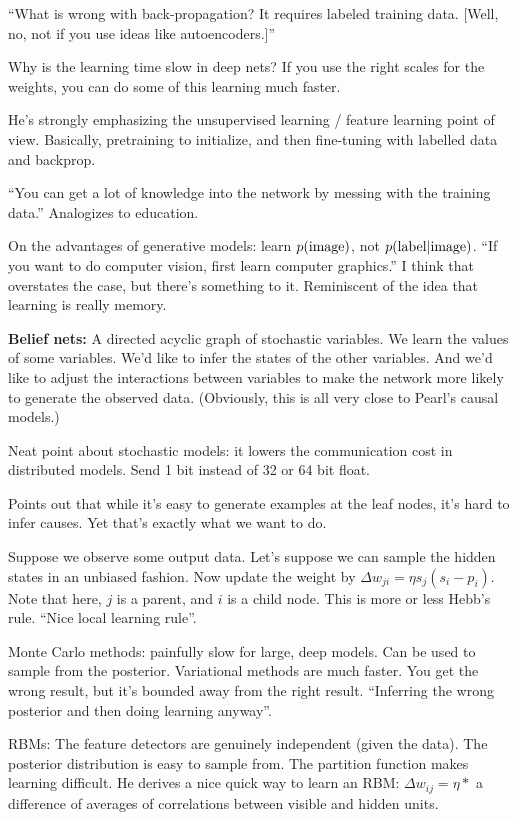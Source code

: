 \documentclass[12pt]{report}
\begin{document}
``What is wrong with back-propagation?  It requires labeled training
data. [Well, no, not if you use ideas like autoencoders.]''

Why is the learning time slow in deep nets?  If you use the right
scales for the weights, you can do some of this learning much faster.

He's strongly emphasizing the unsupervised learning / feature learning
point of view.  Basically, pretraining to initialize, and then
fine-tuning with labelled data and backprop.

``You can get a lot of knowledge into the network by messing with the
training data.''  Analogizes to education.  

On the advantages of generative models: learn $p({\rm image})$, not
$p({\rm label | image})$.  ``If you want to do computer vision, first
learn computer graphics.''  I think that overstates the case, but
there's something to it.  Reminiscent of the idea that learning is
really memory.

\textbf{Belief nets:} A directed acyclic graph of stochastic
variables.  We learn the values of some variables.  We'd like to infer
the states of the other variables.  And we'd like to adjust the
interactions between variables to make the network more likely to
generate the observed data.  (Obviously, this is all very close to
Pearl's causal models.)

Neat point about stochastic models: it lowers the communication cost
in distributed models.  Send 1 bit instead of 32 or 64 bit float.

Points out that while it's easy to generate examples at the leaf
nodes, it's hard to infer causes.  Yet that's exactly what we want to
do.

Suppose we observe some output data.  Let's suppose we can sample the
hidden states in an unbiased fashion.  Now update the weight by
$\Delta w_{ji} = \eta s_j (s_i-p_i)$.  Note that here, $j$ is a
parent, and $i$ is a child node.  This is more or less Hebb's rule.
``Nice local learning rule''.

Monte Carlo methods: painfully slow for large, deep models.  Can be
used to sample from the posterior.  Variational methods are much
faster.  You get the wrong result, but it's bounded away from the
right result.  ``Inferring the wrong posterior and then doing learning
anyway''.

RBMs: The feature detectors are genuinely independent (given the
data).  The posterior distribution is easy to sample from.  The
partition function makes learning difficult.  He derives a nice quick
way to learn an RBM: $\Delta w_{ij} = \eta *$ a difference of
averages of correlations between visible and hidden units.
\end{document}
